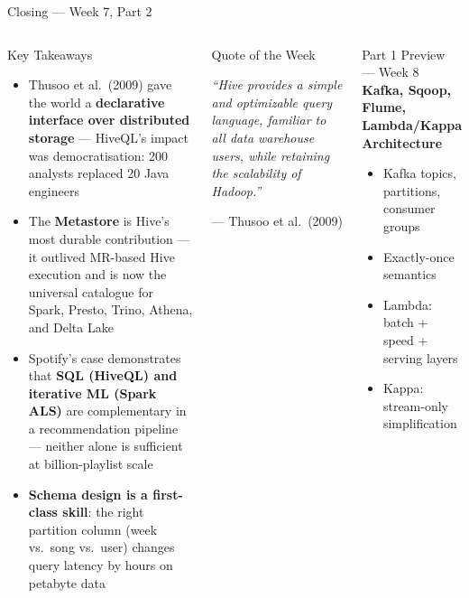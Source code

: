 \documentclass[aspectratio=169,10pt]{beamer}
\begin{document}
\begin{frame}{Closing — Week 7, Part 2}
  \begin{columns}[T]
      \begin{block}{Key Takeaways}
        \begin{itemize}
          \item Thusoo et al.\ (2009) gave the world a
                \textbf{declarative interface over distributed storage}
                — HiveQL's impact was democratisation:
                200 analysts replaced 20 Java engineers
          \item The \textbf{Metastore} is Hive's most durable
                contribution — it outlived MR-based Hive execution
                and is now the universal catalogue for Spark, Presto,
                Trino, Athena, and Delta Lake
          \item Spotify's case demonstrates that
                \textbf{SQL (HiveQL) and iterative ML (Spark ALS)}
                are complementary in a recommendation pipeline —
                neither alone is sufficient at billion-playlist scale
          \item \textbf{Schema design is a first-class skill}:
                the right partition column (week vs.\ song vs.\ user)
                changes query latency by hours on petabyte data
        \end{itemize}
      \end{block}

      \begin{alertblock}{Quote of the Week}
        \begin{center}
        \large\itshape
        ``Hive provides a simple and optimizable
        query language, familiar to all
        data warehouse users, while
        retaining the scalability of Hadoop.''
        \end{center}
        \begin{flushright}
        \small --- Thusoo et al.\ (2009)
        \end{flushright}
      \end{alertblock}
      \vspace{6pt}
      \begin{exampleblock}{Part 1 Preview — Week 8}
        \textbf{Kafka, Sqoop, Flume, Lambda/Kappa Architecture}\\[3pt]
        \begin{itemize}\setlength\itemsep{1pt}
          \item Kafka topics, partitions, consumer groups
          \item Exactly-once semantics
          \item Lambda: batch + speed + serving layers
          \item Kappa: stream-only simplification
        \end{itemize}
      \end{exampleblock}
  \end{columns}
\end{frame}

\end{document}
